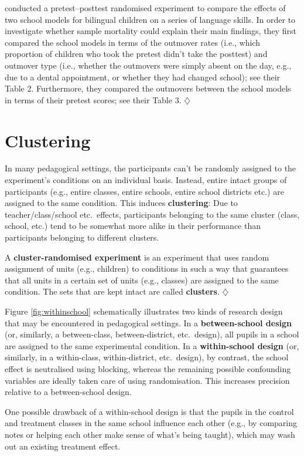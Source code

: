 \documentclass[a4paper]{tufte-book}\usepackage[]{graphicx}\usepackage[]{xcolor}
\newcommand{\term}[1]{\textbf{#1}}
\newcommand*{\parend}[1][$\diamondsuit$]{%
  \unskip\nobreak\hspace{1em plus 1fill}$\diamondsuit$%
}
\begin{document}
\citet{Slavin2011} conducted a pretest--posttest randomised experiment
to compare the effects of two school models for bilingual children
on a series of language skills.
In order to investigate whether sample mortality could explain their main findings,
they first compared the school models in terms 
of the outmover rates (i.e., which proportion of children who took the pretest
didn't take the posttest) 
and outmover type (i.e., whether the outmovers were simply absent on the day, e.g.,
due to a dental appointment, or whether they had changed school); see their Table 2.
Furthermore, they compared the outmovers between the school models 
in terms of their pretest scores; see their Table 3.
\parend

\section{Clustering}\label{sec:clustering}
In many pedagogical settings, the participants can't be randomly
assigned to the experiment's conditions on an individual basis.
Instead, entire intact groups of participants (e.g., entire classes,
entire schools, entire school districts etc.) are assigned to the same
condition. This induces \textbf{clustering}: Due to teacher/class/school etc.\ effects, participants belonging to the same cluster (class, school, etc.) tend to be somewhat more alike in their performance than participants belonging to different clusters.

A \term{cluster-randomised experiment} is an experiment that uses random
assignment of units (e.g., children) to conditions in such a way that guarantees
that all units in a certain set of units (e.g., classes) are assigned
to the same condition.
The sets that are kept intact are called \term{clusters}.
\parend

Figure \ref{fig:withinschool} schematically illustrates two kinds of 
research design that may be encountered in pedagogical settings.
In a \term{between-school design} (or, similarly, a between-class, between-district, etc.\ design),
all pupils in a school are assigned to the same experimental condition.
In a \term{within-school design} (or, similarly, in a within-class, within-district, etc.\ design),
by contrast,
the school effect is neutralised using blocking,
whereas the remaining possible confounding variables are ideally taken care
of using randomisation.
This increases precision relative to a between-school design.

One possible drawback of a within-school design is that
the pupils in the control and treatment classes in the same
school influence each other (e.g., by comparing notes
or helping each other make sense of what's being taught),
which may wash out an existing treatment effect.
\end{document}
